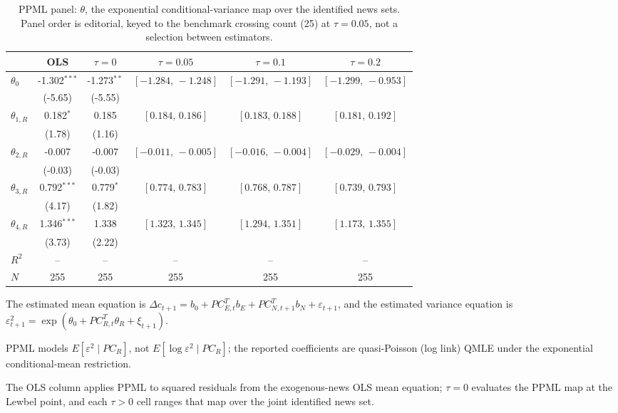 \begin{table}[!htbp]
\centering
\begin{threeparttable}
\caption{PPML panel: $\theta$, the exponential conditional-variance map over the identified news sets. Panel order is editorial, keyed to the benchmark crossing count (25) at $\tau{=}0.05$, not a selection between estimators.}
\label{tab:log_var_eq_panel_ppml}
\footnotesize\setlength{\tabcolsep}{3pt}
\begin{tabular}{lccccc}
\toprule
 & OLS & $\tau{=}0$ & $\tau{=}0.05$ & $\tau{=}0.1$ & $\tau{=}0.2$ \\
\midrule
$\theta_0$ & -1.302$^{***}$ & -1.273$^{**}$ & $[-1.284,\,-1.248]$ & $[-1.291,\,-1.193]$ & $[-1.299,\,-0.953]$ \\
 & (-5.65) & (-5.55) &  &  &  \\
\midrule
$\theta_{1,R}$ & 0.182$^{*}$ & 0.185 & $[0.184,\,0.186]$ & $[0.183,\,0.188]$ & $[0.181,\,0.192]$ \\
 & (1.78) & (1.16) &  &  &  \\
$\theta_{2,R}$ & -0.007 & -0.007 & $[-0.011,\,-0.005]$ & $[-0.016,\,-0.004]$ & $[-0.029,\,-0.004]$ \\
 & (-0.03) & (-0.03) &  &  &  \\
$\theta_{3,R}$ & 0.792$^{***}$ & 0.779$^{*}$ & $[0.774,\,0.783]$ & $[0.768,\,0.787]$ & $[0.739,\,0.793]$ \\
 & (4.17) & (1.82) &  &  &  \\
$\theta_{4,R}$ & 1.346$^{***}$ & 1.338 & $[1.323,\,1.345]$ & $[1.294,\,1.351]$ & $[1.173,\,1.355]$ \\
 & (3.73) & (2.22) &  &  &  \\
$R^2$ & -- & -- & -- & -- & -- \\
$N$ & 255 & 255 & 255 & 255 & 255 \\
\bottomrule
\end{tabular}
\begin{tablenotes}[flushleft]
\scriptsize
\item The estimated mean equation is $\Delta c_{t+1}=b_{0}+PC_{E,t}^{T}b_{E}+ PC_{N,t+1}^{T}b_{N}+\varepsilon_{t+1}$, and the estimated variance equation is $\varepsilon_{t+1}^{2}= \exp(\theta_{0}+PC_{R,t}^{T}\theta_{R}+\xi_{t+1})$.
\item PPML models $E[\varepsilon^2 \mid PC_R]$, not $E[\log \varepsilon^2 \mid PC_R]$; the reported coefficients are quasi-Poisson (log link) QMLE under the exponential conditional-mean restriction.
\item The OLS column applies PPML to squared residuals from the exogenous-news OLS mean equation; $\tau{=}0$ evaluates the PPML map at the Lewbel point, and each $\tau{>}0$ cell ranges that map over the joint identified news set.

\end{tablenotes}
\end{threeparttable}
\end{table}
